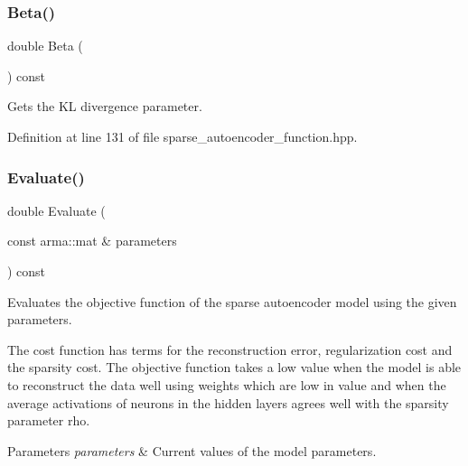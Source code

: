\subsubsection{Beta()\hspace{0.1cm}{\footnotesize\ttfamily [2/2]}}
{\footnotesize\ttfamily double Beta (\begin{DoxyParamCaption}{ }\end{DoxyParamCaption}) const\hspace{0.3cm}{\ttfamily [inline]}}



Gets the KL divergence parameter. 



Definition at line 131 of file sparse\+\_\+autoencoder\+\_\+function.\+hpp.

\mbox{\label{classmlpack_1_1nn_1_1SparseAutoencoderFunction_a6c7f979b684b70aab5bec8b09b5eb1a4}} 
\subsubsection{Evaluate()}
{\footnotesize\ttfamily double Evaluate (\begin{DoxyParamCaption}\item[{const arma\+::mat \&}]{parameters }\end{DoxyParamCaption}) const}



Evaluates the objective function of the sparse autoencoder model using the given parameters. 

The cost function has terms for the reconstruction error, regularization cost and the sparsity cost. The objective function takes a low value when the model is able to reconstruct the data well using weights which are low in value and when the average activations of neurons in the hidden layers agrees well with the sparsity parameter \textquotesingle{}rho\textquotesingle{}.


\begin{DoxyParams}{Parameters}
{\em parameters} & Current values of the model parameters. \\
\hline
\end{DoxyParams}
\mbox{\label{classmlpack_1_1nn_1_1SparseAutoencoderFunction_ac3e9aa612cb56d0d93f3259f4a8122bb}} 
